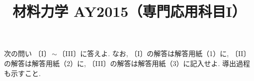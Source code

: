 \documentclass[11pt,a4paper]{article}
\title{材料力学 AY2015（専門応用科目I）}
\author{}
\date{}
\begin{document}
\maketitle

\noindent
次の問い 〔I〕\,$\sim$\,〔III〕に答えよ. なお, 〔I〕の解答は解答用紙（1）に,
〔II〕の解答は解答用紙（2）に, 〔III〕の解答は解答用紙（3）に記入せよ. 導出過程も示すこと.

\bigskip

\clearpage

\clearpage

\end{document}
